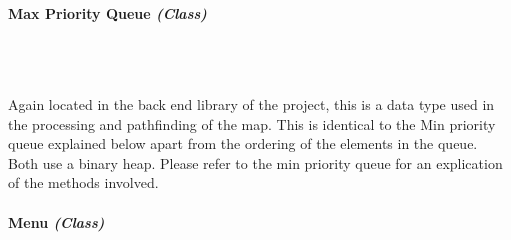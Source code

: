 \begin{FlushLeft}
    \pagebreak
\paragraph{Max Priority Queue \textit{(Class)}} \mbox{} \\

    \begin{figure}[H]
        \centering
    \end{figure}\\
    
    Again located in the back end library of the project, this is a data type used in the processing and pathfinding of the map. This is identical to the Min priority queue explained below apart from the ordering of the elements in the queue. Both use a binary heap. Please refer to the min priority queue for an explication of the methods involved.


    \bk

    \pagebreak
\paragraph{Menu \textit{(Class)}} \mbox{} \\


\end{FlushLeft}
